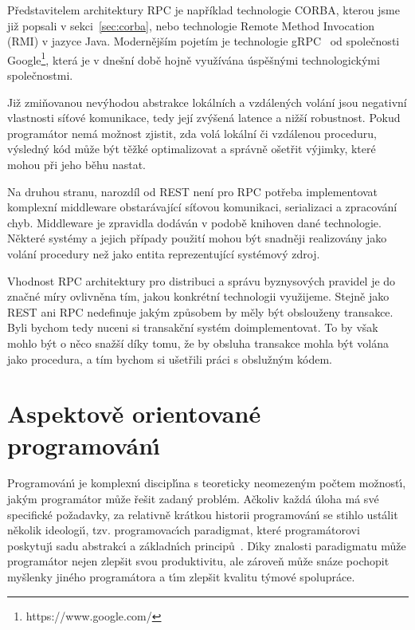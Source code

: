 Představitelem architektury \gls{RPC} je například technologie \gls{CORBA},
kterou jsme již popsali v sekci~\ref{sec:corba}, nebo technologie Remote Method Invocation (\gls{RMI})
v jazyce Java. Modernějším pojetím je technologie gRPC~\cite{grpcio}
od společnosti Google\footnote{https://www.google.com/},
která je v dnešní době hojně využívána úspěšnými technologickými společnostmi.

Již zmiňovanou nevýhodou abstrakce lokálních a vzdálených volání jsou
negativní vlastnosti síťové komunikace, tedy její zvýšená latence
a nižší robustnost. Pokud programátor nemá možnost zjistit, zda volá
lokální či vzdálenou proceduru, výsledný kód může být těžké optimalizovat
a správně ošetřit výjimky, které mohou při jeho běhu nastat.

Na druhou stranu, narozdíl od \gls{REST} není pro \gls{RPC} potřeba
implementovat komplexní middleware obstarávající síťovou komunikaci,
serializaci a zpracování chyb. Middleware je zpravidla dodáván v podobě knihoven
dané technologie. Některé systémy a jejich případy použití mohou být snadněji
realizovány jako volání procedury než jako entita reprezentující systémový zdroj.

Vhodnost \gls{RPC} architektury pro distribuci a správu byznysových pravidel je do značné
míry ovlivněna tím, jakou konkrétní technologii využijeme. Stejně jako \gls{REST}
ani \gls{RPC} nedefinuje jakým způsobem by měly být obslouženy transakce. Byli bychom tedy
nuceni si transakční systém doimplementovat. To by však mohlo být o něco snažší díky tomu,
že by obsluha transakce mohla být volána jako procedura, a tím bychom si ušetřili práci
s obslužným kódem.

\section{Aspektově orientované programován\'{\i}}\label{sec:aop}

Programován\'{\i} je komplexn\'{\i} discipl\'{\i}na s teoreticky
neomezen\'ym počtem možnost\'{\i}, jak\'ym programátor může
řešit zadan\'y problém. Ačkoliv každá úloha má své specifické
požadavky, za relativně krátkou historii programován\'{\i} se
stihlo ustálit několik ideologi\'{\i}, tzv. programovac\'{\i}ch
paradigmat, které programátorovi poskytuj\'{\i} sadu abstrakc\'{\i}
a základn\'{\i}ch principů~\cite{van2009programming}.
D\'{\i}ky znalosti paradigmatu může programátor nejen zlepšit
svou produktivitu, ale zároveň může snáze pochopit myšlenky
jiného programátora a t\'{\i}m zlepšit kvalitu t\'ymové spolupráce.

